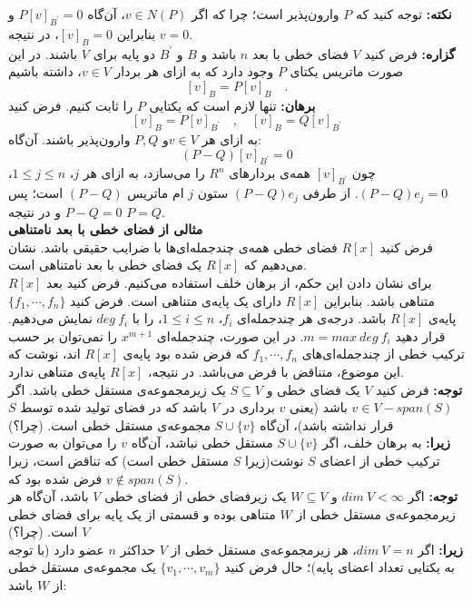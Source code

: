\textbf{نکته:}
توجه کنید که $P$ وارون‌پذیر است؛ چرا که اگر $v\in N(P)$، آن‌گاه $P[v]_{B^\prime}=0$ و بنابراین $[v]_B =0$، در نتیجه $v=0$.\\
\textbf{گزاره:} فرض کنید $V$ فضا‌ی خطی با بعد $n$ باشد و $B$ و $B^\prime$ دو پایه برای $V$ باشند. در این صورت ماتریس یکتا‌ی $P$ وجود دارد که به ازای هر بردار $v\in V$،
داشته باشیم
$$[v]_B = P[v]_B\quad.$$
\textbf{برهان:}
تنها لازم است که یکتایی $P$ را ثابت کنیم. فرض کنید 
$$[v]_B=P[v]_{B^\prime} \quad,\quad [v]_B=Q[v]_{B^\prime}$$
به ازای هر $v \in V$و  $P,Q$ وارون‌پذیر باشند. آن‌گاه:
$$(P-Q)[v]_{B^\prime}=0$$
چون $[v]_{B^\prime}$ همه‌ی بردار‌های $R^n$ را می‌سازد، به ازای هر $j$، $1\leq j\leq n$، $(P-Q)e_j = 0$. از طرفی $(P-Q)e_j$ ستون $j$ ام ماتریس $(P-Q)$ است؛ پس $P-Q=0$ و در نتیجه $P=Q$.\\
\textbf{مثالی از فضا‌ی خطی با بعد نامتناهی}\\
فرض کنید $R[x]$ فضا‌ی خطی همه‌ی چند‌جمله‌ای‌ها با ضرایب حقیقی باشد. نشان می‌دهیم که $R[x]$ یک فضا‌ی خطی با بعد نامتناهی است.\\
برای نشان دادن این حکم، از برهان خلف استفاده می‌کنیم. فرض کنید بعد $R[x]$ متناهی باشد. بنابراین $R[x]$ دارای یک پایه‌ی متناهی است. فرض کنید $\{f_1,\cdots,f_n\}$ پایه‌ی $R[x]$ باشد. درجه‌ی هر چند‌جمله‌ای $f_i$، $1\leq i\leq n$، را با $deg\:f_i$ نمایش می‌دهیم. قرار دهید $m=max\:deg\:f_i$. در این صورت، چند‌جمله‌ای $x^{m+1}$ را نمی‌توان بر حسب ترکیب خطی از چند‌جمله‌ای‌های $f_1,\cdots,f_n$ که فرض شده بود پایه‌ی $R[x]$ اند، نوشت که این موضوع، متناقض با فرض می‌باشد. در نتیجه، $R[x]$ پایه‌ی متناهی ندارد.\\
\textbf{توجه: }
فرض کنید $V$ یک فضا‌ی خطی و $S\subseteq V$ یک زیر‌مجموعه‌ی مستقل خطی باشد. اگر $v\in V-span(S)$ باشد (یعنی $v$ برداری در $V$ باشد که در فضا‌ی تولید‌ شده توسط $S$ قرار نداشته باشد)، آن‌گاه $S\cup \{v\}$ مجموعه‌ی مستقل خطی است. (چرا؟)\\
\textbf{زیرا:}
به برهان خلف، اگر $S\cup \{v\}$ مستقل خطی نباشد، آن‌گاه $v$ را می‌توان به صورت ترکیب خطی از اعضا‌ی $S$ نوشت(زیرا $S$ مستقل خطی است) که تناقض است، زیرا فرض شده بود که $v\notin span(S)$.\\
\textbf{توجه: }
اگر $dim\:V<\infty$ و $W\subseteq V$ یک زیر‌فضا‌ی خطی از فضا‌ی خطی $V$ باشد، آن‌گاه هر زیر‌مجموعه‌ی مستقل خطی از $W$ متناهی بوده و قسمتی از یک پایه برای فضا‌ی خطی $V$ است. (چرا؟)\\
\textbf{زیرا:}
اگر $dim\: V = n$، هر زیر‌مجموعه‌ی مستقل خطی از $V$ حداکثر $n$ عضو دارد (با توجه به یکتایی تعداد اعضای پایه)؛ حال فرض کنید $\{v_1,\cdots,v_m\}$ یک مجموعه‌ی مستقل خطی از $W$ باشد:\\
